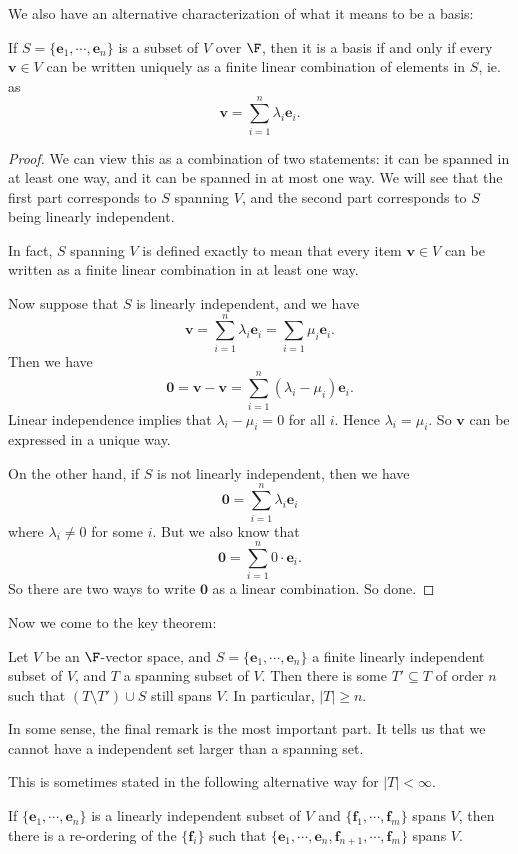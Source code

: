 \documentclass[a4paper]{article}
\begin{document}
We also have an alternative characterization of what it means to be a basis:
\begin{prop}
  If $S = \{\mathbf{e}_1, \cdots, \mathbf{e}_n\}$ is a subset of $V$ over $\F$, then it is a basis if and only if every $\mathbf{v}\in V$ can be written uniquely as a finite linear combination of elements in $S$, ie. as
  \[
    \mathbf{v} = \sum_{i = 1}^n \lambda_i \mathbf{e}_i.
  \]
\end{prop}

\begin{proof}
  We can view this as a combination of two statements: it can be spanned in at least one way, and it can be spanned in at most one way. We will see that the first part corresponds to $S$ spanning $V$, and the second part corresponds to $S$ being linearly independent.

  In fact, $S$ spanning $V$ is defined exactly to mean that every item $\mathbf{v}\in V$ can be written as a finite linear combination in at least one way.

  Now suppose that $S$ is linearly independent, and we have
  \[
    \mathbf{v} = \sum_{i = 1}^n \lambda_i \mathbf{e}_i = \sum_{i = 1}\mu_i \mathbf{e}_i.
  \]
  Then we have
  \[
    \mathbf{0} = \mathbf{v} - \mathbf{v} = \sum_{i = 1}^n (\lambda_i - \mu_i) \mathbf{e}_i.
  \]
  Linear independence implies that $\lambda_i - \mu_i = 0$ for all $i$. Hence $\lambda_i = \mu_i$. So $\mathbf{v}$ can be expressed in a unique way.

  On the other hand, if $S$ is not linearly independent, then we have
  \[
    \mathbf{0} = \sum_{i = 1}^n \lambda_i \mathbf{e}_i
  \]
  where $\lambda_i \not= 0$ for some $i$. But we also know that
  \[
    \mathbf{0} = \sum_{i = 1}^n 0\cdot \mathbf{e}_i.
  \]
  So there are two ways to write $\mathbf{0}$ as a linear combination. So done.
\end{proof}

Now we come to the key theorem:
\begin{thm}
  Let $V$ be an $\F$-vector space, and $S = \{\mathbf{e}_1, \cdots, \mathbf{e}_n\}$ a finite linearly independent subset of $V$, and $T$ a spanning subset of $V$. Then there is some $T'\subseteq T$ of order $n$ such that $(T\setminus T') \cup S$ still spans $V$. In particular, $|T| \geq n$.
\end{thm}
In some sense, the final remark is the most important part. It tells us that we cannot have a independent set larger than a spanning set.

This is sometimes stated in the following alternative way for $|T| < \infty$.
\begin{cor}
  If $\{\mathbf{e}_1, \cdots, \mathbf{e}_n\}$ is a linearly independent subset of $V$ and $\{\mathbf{f}_1, \cdots, \mathbf{f}_m\}$ spans $V$, then there is a re-ordering of the $\{\mathbf{f}_i\}$ such that $\{\mathbf{e}_1,\cdots, \mathbf{e}_n, \mathbf{f}_{n + 1}, \cdots, \mathbf{f}_m\}$ spans $V$.
\end{cor}
\end{document}
